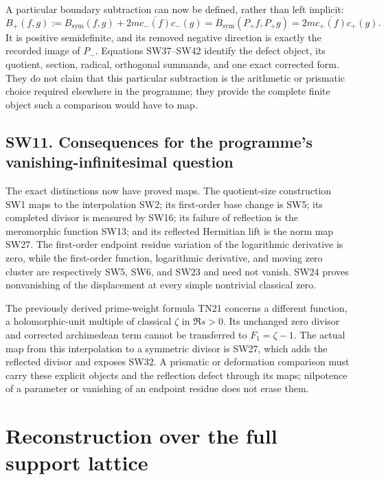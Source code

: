 \documentclass[
  10pt,
  a4paper,
]{article}
\begin{document}
A particular boundary subtraction can now be defined, rather than left
implicit: \[
B_+(f,g):=B_{\mathrm{sym}}(f,g)+2m\overline{c_-(f)}c_-(g)
=B_{\mathrm{sym}}(P_+f,P_+g)=2m\overline{c_+(f)}c_+(g).
\tag{SW42}
\] It is positive semidefinite, and its removed negative direction is
exactly the recorded image of \(P_-\). Equations SW37--SW42 identify the
defect object, its quotient, section, radical, orthogonal summands, and
one exact corrected form. They do not claim that this particular
subtraction is the arithmetic or prismatic choice required elsewhere in
the programme; they provide the complete finite object such a comparison
would have to map.

\subsection{SW11. Consequences for the programme's
vanishing-infinitesimal
question}\label{sw11.-consequences-for-the-programmes-vanishing-infinitesimal-question}

The exact distinctions now have proved maps. The quotient-size
construction SW1 maps to the interpolation SW2; its first-order base
change is SW5; its completed divisor is measured by SW16; its failure of
reflection is the meromorphic function SW13; and its reflected Hermitian
lift is the norm map SW27. The first-order endpoint residue variation of
the logarithmic derivative is zero, while the first-order function,
logarithmic derivative, and moving zero cluster are respectively SW5,
SW6, and SW23 and need not vanish. SW24 proves nonvanishing of the
displacement at every simple nontrivial classical zero.

The previously derived prime-weight formula TN21 concerns a different
function, a holomorphic-unit multiple of classical \(\zeta\) in
\(\Re s>0\). Its unchanged zero divisor and corrected archimedean term
cannot be transferred to \(F_1=\zeta-1\). The actual map from this
interpolation to a symmetric divisor is SW27, which adds the reflected
divisor and exposes SW32. A prismatic or deformation comparison must
carry these explicit objects and the reflection defect through its maps;
nilpotence of a parameter or vanishing of an endpoint residue does not
erase them.

\clearpage

\section{Reconstruction over the full support
lattice}\label{reconstruction-over-the-full-support-lattice}
\end{document}
